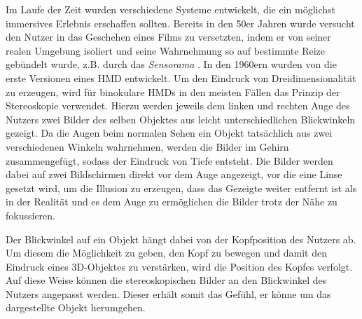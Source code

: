 Im Laufe der Zeit wurden verschiedene Systeme entwickelt, die ein möglichst immersives Erlebnis erschaffen sollten. 
Bereits in den 50er Jahren wurde versucht den Nutzer in das Geschehen eines Films zu versetzten, indem er von seiner realen Umgebung isoliert und seine Wahrnehmung so auf bestimmte Reize gebündelt wurde, z.B. durch das \textit{Sensorama} \cite{sensorama}. %
In den 1960ern wurden von \cite{Sutherland68} die erste Versionen eines HMD entwickelt. %
Um den Eindruck von Dreidimensionalität zu erzeugen, wird für binokulare HMDs in den meisten Fällen das Prinzip der Stereoskopie verwendet. Hierzu werden jeweils dem linken und rechten Auge des Nutzers zwei Bilder des selben Objektes aus leicht unterschiedlichen Blickwinkeln  gezeigt. Da die Augen beim normalen Sehen ein Objekt tatsächlich aus zwei verschiedenen Winkeln wahrnehmen, werden die Bilder im Gehirn zusammengefügt, sodass der Eindruck von Tiefe entsteht. Die Bilder werden dabei auf zwei Bildschirmen direkt vor dem Auge angezeigt, vor die eine Linse gesetzt wird, um die Illusion zu erzeugen, dass das Gezeigte weiter entfernt ist als in der Realität und es dem Auge zu ermöglichen die Bilder trotz der Nähe zu fokussieren.

Der Blickwinkel auf ein Objekt hängt dabei von der Kopfposition des Nutzers ab. Um diesem die Möglichkeit zu geben, den Kopf zu bewegen und damit den Eindruck eines 3D-Objektes zu verstärken, wird die Position des Kopfes verfolgt. Auf diese Weise können die stereoskopischen Bilder an den Blickwinkel des Nutzers angepasst werden. Dieser erhält somit das Gefühl, er könne um das dargestellte Objekt herumgehen. 

